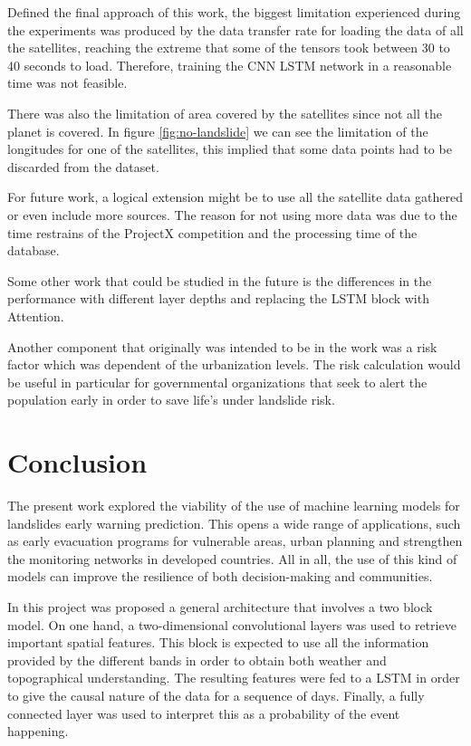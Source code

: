 \documentclass[sigconf, nonacm]{acmart}
\begin{document}
Defined the final approach of this work, the biggest limitation experienced during the experiments was produced by the data transfer rate for loading the data of all the satellites, reaching the extreme that some of the tensors took between 30 to 40 seconds to load. Therefore, training the CNN LSTM network in a reasonable time was not feasible. 

There was also the limitation of area covered by the satellites since not all the planet is covered. In figure \ref{fig:no-landslide} we can see the limitation of the longitudes for one of the satellites, this implied that some data points had to be discarded from the dataset.

For future work, a logical extension might be to use all the satellite data gathered or even include more sources. The reason for not using more data was due to the time restrains of the ProjectX competition and the processing time of the database. 

Some other work that could be studied in the future is the differences in the performance with different layer depths and replacing the LSTM block with Attention. 

Another component that originally was intended to be in the work was a risk factor which was dependent of the urbanization levels. The risk calculation would be useful in particular for governmental organizations that seek to alert the population early in order to save life's under landslide risk.



\section{Conclusion}

The present work explored the viability of the use of machine learning models for landslides early warning prediction. This opens a wide range of applications, such as early evacuation programs for vulnerable areas, urban planning and strengthen the monitoring networks in developed countries. All in all, the use of this kind of models can improve the resilience of both decision-making and communities.

In this project was proposed a general architecture that involves a two block model. On one hand, a two-dimensional convolutional layers was used to retrieve important spatial features. This block is expected to use all the information provided by the different bands in order to obtain both weather and topographical understanding. The resulting features were fed to a LSTM in order to give the causal nature of the data for a sequence of days. Finally, a fully connected layer was used to interpret this as a probability of the event happening.
\end{document}
